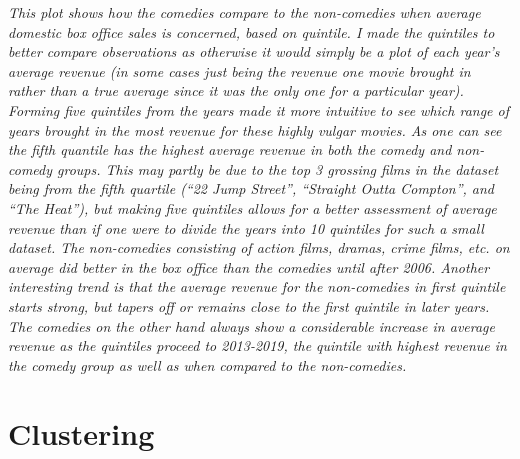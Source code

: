 \documentclass[]{article}
\newenvironment{Shaded}{\begin{snugshade}}{\end{snugshade}}
\newcommand{\ControlFlowTok}[1]{\textcolor[rgb]{0.13,0.29,0.53}{\textbf{#1}}}
\newcommand{\DataTypeTok}[1]{\textcolor[rgb]{0.13,0.29,0.53}{#1}}
\newcommand{\DecValTok}[1]{\textcolor[rgb]{0.00,0.00,0.81}{#1}}
\newcommand{\KeywordTok}[1]{\textcolor[rgb]{0.13,0.29,0.53}{\textbf{#1}}}
\newcommand{\NormalTok}[1]{#1}
\newcommand{\OperatorTok}[1]{\textcolor[rgb]{0.81,0.36,0.00}{\textbf{#1}}}
\newcommand{\StringTok}[1]{\textcolor[rgb]{0.31,0.60,0.02}{#1}}
\begin{document}
\emph{This plot shows how the comedies compare to the non-comedies when
average domestic box office sales is concerned, based on quintile. I
made the quintiles to better compare observations as otherwise it would
simply be a plot of each year's average revenue (in some cases just
being the revenue one movie brought in rather than a true average since
it was the only one for a particular year). Forming five quintiles from
the years made it more intuitive to see which range of years brought in
the most revenue for these highly vulgar movies. As one can see the
fifth quantile has the highest average revenue in both the comedy and
non-comedy groups. This may partly be due to the top 3 grossing films in
the dataset being from the fifth quartile (``22 Jump Street'',
``Straight Outta Compton'', and ``The Heat''), but making five quintiles
allows for a better assessment of average revenue than if one were to
divide the years into 10 quintiles for such a small dataset. The
non-comedies consisting of action films, dramas, crime films, etc. on
average did better in the box office than the comedies until after 2006.
Another interesting trend is that the average revenue for the
non-comedies in first quintile starts strong, but tapers off or remains
close to the first quintile in later years. The comedies on the other
hand always show a considerable increase in average revenue as the
quintiles proceed to 2013-2019, the quintile with highest revenue in the
comedy group as well as when compared to the non-comedies.}

\hypertarget{clustering}{%
\section{Clustering}\label{clustering}}

\begin{Shaded}
\end{Shaded}
\end{document}
